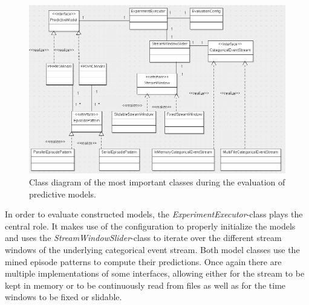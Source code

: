 \begin{figure}[h]
	\centering
  	\includegraphics[width=\textwidth]{classDiagram1}
	\caption[Class Diagram: Test Phase]{Class diagram of the most important classes during the evaluation of predictive models.}
	\label{fig_classDiagram1}
\end{figure}

In order to evaluate constructed models, the \textit{ExperimentExecutor}-class plays the central role. It makes use of the configuration to properly initialize the models and uses the \textit{StreamWindowSlider}-class to iterate over the different stream windows of the underlying categorical event stream. Both model classes use the mined episode patterns to compute their predictions. Once again there are multiple implementations of some interfaces, allowing either for the stream to be kept in memory or to be continuously read from files as well as for the time windows to be fixed or slidable. 

